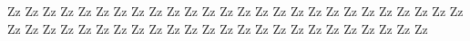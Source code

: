 \documentclass{worksheet}
\begin{document}
\begin{drillsheet}
\calligra
Zz Zz Zz Zz Zz Zz Zz Zz Zz Zz Zz Zz Zz Zz Zz Zz Zz Zz Zz Zz Zz Zz Zz Zz Zz Zz Zz Zz Zz Zz Zz Zz Zz Zz Zz Zz Zz Zz Zz Zz Zz Zz Zz Zz Zz Zz Zz Zz Zz Zz
\end{drillsheet}
\end{document}
